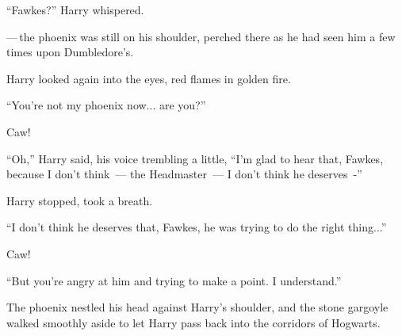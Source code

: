 ``Fawkes?'' Harry whispered.

---\,the phoenix was still on his shoulder, perched there as he had seen him a few times upon Dumbledore's.

Harry looked again into the eyes, red flames in golden fire.

``You're not my phoenix now... are you?''

Caw!

``Oh,'' Harry said, his voice trembling a little, ``I'm glad to hear that, Fawkes, because I don't think~--- the Headmaster~--- I don't think he deserves~-''

Harry stopped, took a breath.

``I don't think he deserves that, Fawkes, he was trying to do the right thing...''

Caw!

``But you're angry at him and trying to make a point. I understand.''

The phoenix nestled his head against Harry's shoulder, and the stone gargoyle walked smoothly aside to let Harry pass back into the corridors of Hogwarts.
